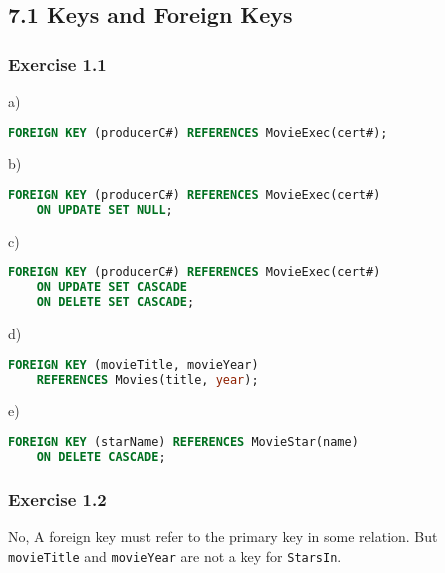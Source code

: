\documentclass[../../main.tex]{subfiles}
\begin{document}
\subsection*{7.1 Keys and Foreign Keys}

\subsubsection*{Exercise 1.1}

a)

\begin{lstlisting}[language=sql]
  FOREIGN KEY (producerC#) REFERENCES MovieExec(cert#);
\end{lstlisting}

b)

\begin{lstlisting}[language=sql]
  FOREIGN KEY (producerC#) REFERENCES MovieExec(cert#)
    ON UPDATE SET NULL;
\end{lstlisting}

c)

\begin{lstlisting}[language=sql]
  FOREIGN KEY (producerC#) REFERENCES MovieExec(cert#)
    ON UPDATE SET CASCADE
    ON DELETE SET CASCADE;
\end{lstlisting}

d)

\begin{lstlisting}[language=sql]
  FOREIGN KEY (movieTitle, movieYear)
    REFERENCES Movies(title, year);
\end{lstlisting}

e)

\begin{lstlisting}[language=sql]
  FOREIGN KEY (starName) REFERENCES MovieStar(name)
    ON DELETE CASCADE;
\end{lstlisting}

\subsubsection*{Exercise 1.2}

No, A foreign key must refer to the primary key in some
relation. But \verb|movieTitle| and \verb|movieYear|
are not a key for \verb|StarsIn|.
\end{document}
